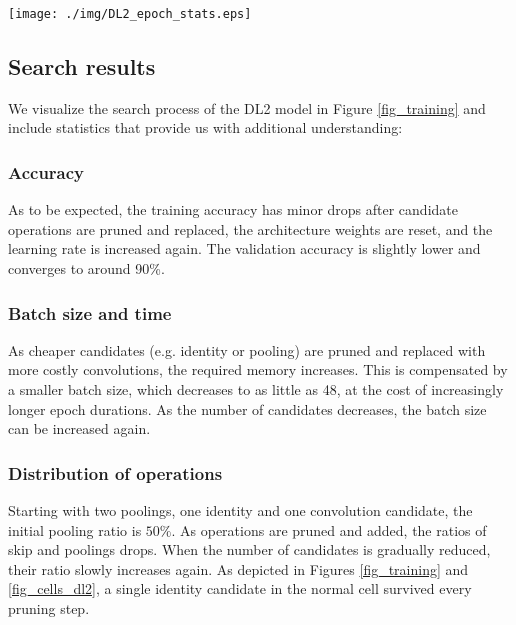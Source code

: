 \documentclass[conference]{IEEEtran}
\begin{document}
\begin{figure*}[htbp]
	\centerline{\texttt{[image: ./img/DL2\_epoch\_stats.eps]}}
	\caption{
		The search process of our PR-DARTS DL2 cells, best viewed in color.
	}
	\label{fig_training}
\end{figure*}




\subsection{Search results}
\label{ss_results_search}

We visualize the search process of the DL2 model in Figure \ref{fig_training} and include statistics that provide us with additional understanding:


\subsubsection*{Accuracy}
As to be expected, the training accuracy has minor drops after candidate operations are pruned and replaced, the architecture weights are reset, and the learning rate is increased again. The validation accuracy is slightly lower and converges to around 90\%.


\subsubsection*{Batch size and time}
As cheaper candidates (e.g. identity or pooling) are pruned and replaced with more costly convolutions, the required memory increases. This is compensated by a smaller batch size, which decreases to as little as 48, at the cost of increasingly longer epoch durations. As the number of candidates decreases, the batch size can be increased again.


\subsubsection*{Distribution of operations}
Starting with two poolings, one identity and one convolution candidate, the initial pooling ratio is $50\%$.
As operations are pruned and added, the ratios of skip and poolings drops. When the number of candidates is gradually reduced, their ratio slowly increases again.
As depicted in Figures \ref{fig_training} and \ref{fig_cells_dl2}, a single identity candidate in the normal cell survived every pruning step.
\end{document}
